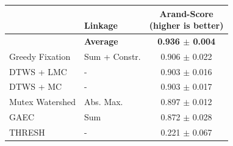 \begin{figure}[t]
        \centering
\begin{minipage}[t]{0.48\textwidth}
    \centering
    \scriptsize
        \begin{tabular}[t]{l|l|c}
         & \makecell[l]{\algname{}\\ Linkage} & \makecell{Arand-Score \\(higher is better)} \\ \midrule 
\textbf{\algname{}} & \textbf{Average}& \textbf{0.936 $\pm$ 0.004}  \\
Greedy Fixation \cite{levinkov2017comparative} & Sum + Constr. & 0.906 $\pm$ 0.022 \\
DTWS + LMC & -& 0.903 $\pm$ 0.016 \\
DTWS + MC & -& 0.903 $\pm$ 0.017 \\
Mutex Watershed \cite{wolf2018mutex} & Abs. Max.  & 0.897 $\pm$ 0.012 \\
GAEC \cite{keuper2015efficient} & Sum & 0.872 $\pm$ 0.028 \\
THRESH &-& 0.221  $\pm$ 0.067 \\ 
        \end{tabular}
    \label{tab:results_cremi_train}
\end{minipage}\hfill
\begin{minipage}[t]{0.48\textwidth}
    \centering
    \scriptsize
        \begin{tabular}[t]{l|c}

\end{tabular}
\end{minipage}
\end{figure}
